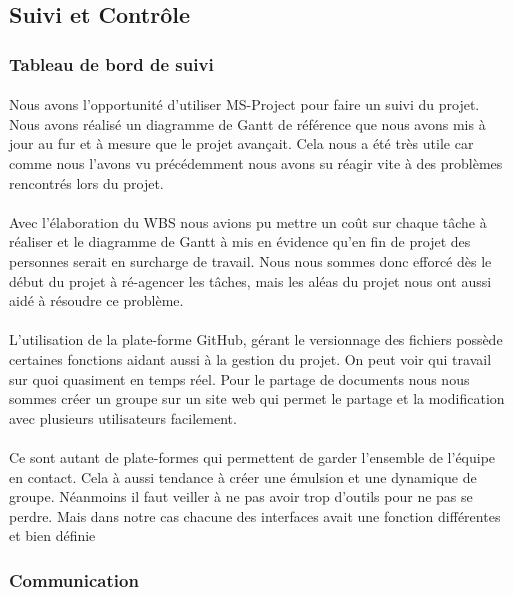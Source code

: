 \subsection{Suivi et Contrôle}
    \subsubsection{Tableau de bord de suivi}
    \paragraph{}
    Nous avons l'opportunité d'utiliser MS-Project pour faire un suivi du projet. Nous avons réalisé un diagramme de Gantt de référence que nous avons mis à jour au fur et à mesure que le projet avançait. Cela nous a été très utile car comme nous l'avons vu précédemment nous avons su réagir vite à des problèmes rencontrés lors du projet. 
    \paragraph{}
    Avec l'élaboration du WBS nous avions pu mettre un coût sur chaque tâche à réaliser et le diagramme de Gantt à mis en évidence qu'en fin de projet des personnes serait en surcharge de travail. Nous nous sommes donc efforcé dès le début du projet à ré-agencer les tâches, mais les aléas du projet nous ont aussi aidé à résoudre ce problème.  
    \paragraph{}
    L'utilisation de la plate-forme GitHub, gérant le versionnage des fichiers possède certaines fonctions aidant aussi à la gestion du projet. On peut voir qui travail sur quoi quasiment en temps réel.
    Pour le partage de documents nous nous sommes créer un groupe sur un site web qui permet le partage et la modification avec plusieurs utilisateurs facilement.
    \paragraph{}
    Ce sont autant de plate-formes qui permettent de garder l'ensemble de l'équipe en contact. Cela à aussi tendance à créer une émulsion et une dynamique de groupe. Néanmoins il faut veiller à ne pas avoir trop d'outils pour ne pas se perdre. Mais dans notre cas chacune des interfaces avait une fonction différentes et bien définie

    \subsubsection{Communication}
